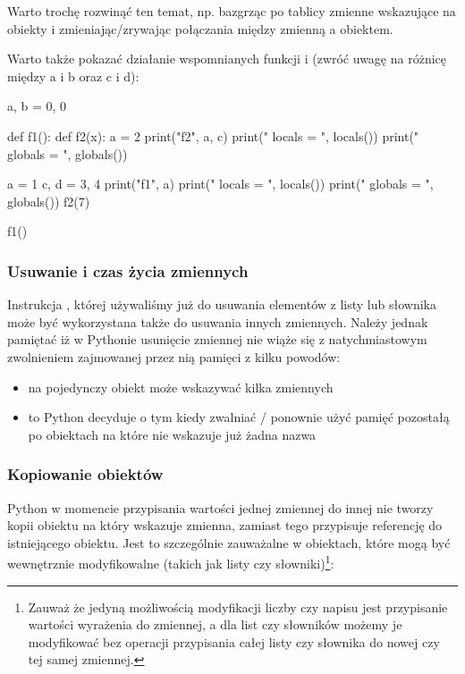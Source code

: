 \begin{teacherOnly}
Warto trochę rozwinąć ten temat, np. bazgrząc po tablicy zmienne wskazujące na obiekty i zmieniając/zrywając połączania między zmienną a obiektem.

Warto także pokazać działanie wspomnianych funkcji  i  (zwróć uwagę na różnicę między a i b oraz c i d):
\begin{CodeFrame*}[python]{}
a, b = 0, 0

def f1():
    def f2(x):
       a = 2
       print("f2", a, c)
       print(" locals  = ", locals())
       print(" globals = ", globals())
    
    a = 1
    c, d = 3, 4
    print("f1", a)
    print(" locals  = ", locals())
    print(" globals = ", globals())
    f2(7)

f1()
\end{CodeFrame*}
\end{teacherOnly}

\subsubsection{Usuwanie i czas życia zmiennych}

Instrukcja , której używaliśmy już do usuwania elementów z listy lub słownika może być wykorzystana także do usuwania innych zmiennych.
Należy jednak pamiętać iż w Pythonie usunięcie zmiennej nie wiąże się z natychmiastowym zwolnieniem zajmowanej przez nią pamięci z kilku powodów:
\begin{itemize}
\item na pojedynczy obiekt może wskazywać kilka zmiennych
\item to Python decyduje o tym kiedy zwalniać / ponownie użyć pamięć pozostałą po obiektach na które nie wskazuje już żadna nazwa
\end{itemize}

\subsubsection{Kopiowanie obiektów}

Python w momencie przypisania wartości jednej zmiennej do innej nie tworzy kopii obiektu na który wskazuje zmienna, zamiast tego przypisuje referencję do istniejącego obiektu.
Jest to szczególnie zauważalne w obiektach, które mogą być wewnętrznie modyfikowalne (takich jak listy czy słowniki)\footnote{
Zauważ że jedyną możliwością modyfikacji liczby czy napisu jest przypisanie wartości wyrażenia do zmiennej,
a dla list czy słowników możemy je modyfikować bez operacji przypisania całej listy czy słownika do nowej czy tej samej zmiennej.
}:

